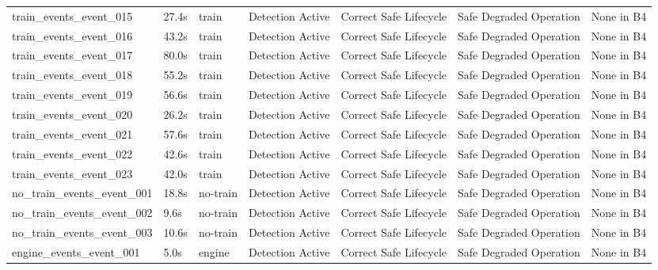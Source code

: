 \begin{table}[t]
\begin{tabular}{lllllll}
train\_events\_event\_015 & 27.4s & train & Detection Active & Correct Safe Lifecycle & Safe Degraded Operation & None in B4 \\
train\_events\_event\_016 & 43.2s & train & Detection Active & Correct Safe Lifecycle & Safe Degraded Operation & None in B4 \\
train\_events\_event\_017 & 80.0s & train & Detection Active & Correct Safe Lifecycle & Safe Degraded Operation & None in B4 \\
train\_events\_event\_018 & 55.2s & train & Detection Active & Correct Safe Lifecycle & Safe Degraded Operation & None in B4 \\
train\_events\_event\_019 & 56.6s & train & Detection Active & Correct Safe Lifecycle & Safe Degraded Operation & None in B4 \\
train\_events\_event\_020 & 26.2s & train & Detection Active & Correct Safe Lifecycle & Safe Degraded Operation & None in B4 \\
train\_events\_event\_021 & 57.6s & train & Detection Active & Correct Safe Lifecycle & Safe Degraded Operation & None in B4 \\
train\_events\_event\_022 & 42.6s & train & Detection Active & Correct Safe Lifecycle & Safe Degraded Operation & None in B4 \\
train\_events\_event\_023 & 42.0s & train & Detection Active & Correct Safe Lifecycle & Safe Degraded Operation & None in B4 \\
no\_train\_events\_event\_001 & 18.8s & no-train & Detection Active & Correct Safe Lifecycle & Safe Degraded Operation & None in B4 \\
no\_train\_events\_event\_002 & 9.6s & no-train & Detection Active & Correct Safe Lifecycle & Safe Degraded Operation & None in B4 \\
no\_train\_events\_event\_003 & 10.6s & no-train & Detection Active & Correct Safe Lifecycle & Safe Degraded Operation & None in B4 \\
engine\_events\_event\_001 & 5.0s & engine & Detection Active & Correct Safe Lifecycle & Safe Degraded Operation & None in B4 \\
\hline
\end{tabular}
\end{table}
